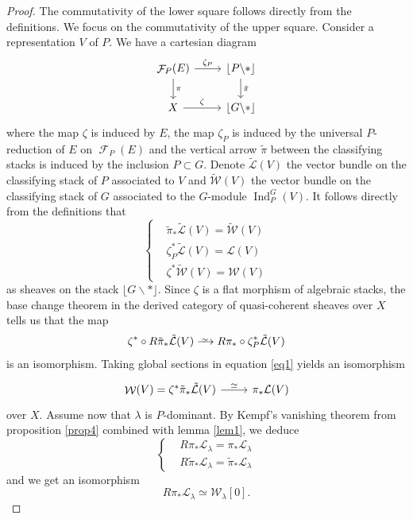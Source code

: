 \documentclass[11pt]{amsart}
\numberwithin{subsection}{section}
\numberwithin{figure}{section}
\numberwithin{table}{section}
\theoremstyle{1}
\theoremstyle{2}
\DeclareMathOperator{\Ind}{Ind}
\DeclareMathOperator{\Fc}{\mathcal{F}}
\DeclareMathOperator{\W}{\mathcal{W}}
\newcommand{\DistTo}{\xrightarrow{
   \,\smash{\raisebox{-0.65ex}{\ensuremath{\scriptstyle\sim}}}\,}}
\begin{document}
\begin{proof}
The commutativity of the lower square follows directly from the definitions. We focus on the commutativity of the upper square. Consider a representation $V$ of $P$. We have a cartesian diagram
\begin{equation*}
\begin{tikzcd}
\Fc_P(E) \arrow[d,"\pi"] \arrow[r,"\zeta_P"] & \lfloor P \backslash * \rfloor \arrow[d,"\tilde{\pi}"] \\
X \arrow[r,"\zeta"] & \lfloor G \backslash * \rfloor
\end{tikzcd}
\end{equation*}
where the map $\zeta$ is induced by $E$, the map $\zeta_P$ is induced by the universal $P$-reduction of $E$ on $\Fc_P(E)$ and the vertical arrow $\tilde{\pi}$ between the classifying stacks is induced by the inclusion $P \subset G$. Denote $\tilde{\mathcal{L}}(V)$ the vector bundle on the classifying stack of $P$ associated to $V$ and $\tilde{\mathcal{W}}(V)$ the vector bundle on the classifying stack of $G$ associated to the $G$-module $\Ind_P^G (V)$. It follows directly from the definitions that
\begin{equation*}
\left\{
\begin{aligned}
&\tilde{\pi}_* \tilde{\mathcal{L}}(V) = \tilde{\mathcal{W}}(V) \\
&\zeta_{P}^*\tilde{\mathcal{L}}(V) = \mathcal{L}(V) \\
&\zeta^*\tilde{\mathcal{W}}(V) = \mathcal{W}(V)
\end{aligned}
\right.
\end{equation*}
as sheaves on the stack $ \lfloor G \backslash * \rfloor$. Since $\zeta$ is a flat morphism of algebraic stacks, the base change theorem in the derived category of quasi-coherent sheaves over $X$ tells us that the map
\begin{equation}\label{eq1}
\zeta^* \circ {R}\tilde{\pi}_* \tilde{\mathcal{L}}(V)  \DistTo {R}\pi_*\circ \zeta_{P}^*\tilde{\mathcal{L}}(V)
\end{equation}
is an isomorphism. Taking global sections in equation \ref{eq1} yields an isomorphism
\begin{equation*}
\begin{tikzcd}
\W(V) = \zeta^*\tilde{\pi}_* \tilde{\mathcal{L}}(V) \arrow[r,"\simeq"] & \pi_* \mathcal{L}(V)
\end{tikzcd}
\end{equation*}
over $X$. Assume now that $\lambda$ is $P$-dominant. By Kempf's vanishing theorem from proposition \ref{prop4} combined with lemma \ref{lem1}, we deduce
\begin{equation*}
\left\{
\begin{aligned}
&{R}\pi_* \mathcal{L}_{\lambda} = \pi_* \mathcal{L}_{\lambda} \\
&{R}\tilde{\pi}_* \mathcal{L}_{\lambda} = \tilde{\pi}_*  \mathcal{L}_{\lambda}
\end{aligned}
\right.
\end{equation*}
and we get an isomorphism
\begin{equation*}
R\pi_* \mathcal{L}_{\lambda} \simeq \mathcal{W}_{\lambda} [0].
\end{equation*}
\end{proof}
\end{document}
